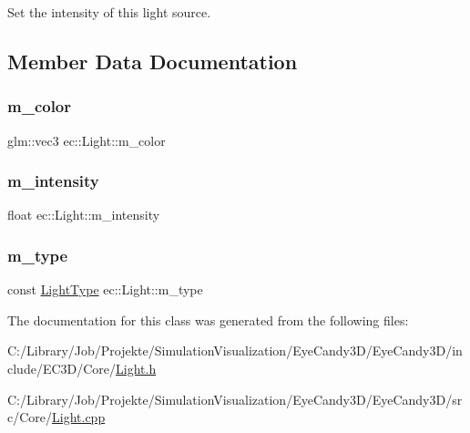 Set the intensity of this light source. 

\subsection{Member Data Documentation}
\mbox{\label{classec_1_1_light_a7dfc41f1e8f2d7ddad97d60c610c302e}} 
\subsubsection{\texorpdfstring{m\+\_\+color}{m\_color}}
{\footnotesize\ttfamily glm\+::vec3 ec\+::\+Light\+::m\+\_\+color\hspace{0.3cm}{\ttfamily [protected]}}

\mbox{\label{classec_1_1_light_ac655cc4148d5aa4d052bace97770f3b1}} 
\subsubsection{\texorpdfstring{m\+\_\+intensity}{m\_intensity}}
{\footnotesize\ttfamily float ec\+::\+Light\+::m\+\_\+intensity\hspace{0.3cm}{\ttfamily [protected]}}

\mbox{\label{classec_1_1_light_ae3d04075982c6c62e7687b214a504c30}} 
\subsubsection{\texorpdfstring{m\+\_\+type}{m\_type}}
{\footnotesize\ttfamily const \mbox{\hyperlink{namespaceec_a30e2a743ebdeb02ac68a6cfa50f629c7}{Light\+Type}} ec\+::\+Light\+::m\+\_\+type\hspace{0.3cm}{\ttfamily [protected]}}



The documentation for this class was generated from the following files\+:\begin{DoxyCompactItemize}
\item 
C\+:/\+Library/\+Job/\+Projekte/\+Simulation\+Visualization/\+Eye\+Candy3\+D/\+Eye\+Candy3\+D/include/\+E\+C3\+D/\+Core/\mbox{\hyperlink{_light_8h}{Light.\+h}}\item 
C\+:/\+Library/\+Job/\+Projekte/\+Simulation\+Visualization/\+Eye\+Candy3\+D/\+Eye\+Candy3\+D/src/\+Core/\mbox{\hyperlink{_light_8cpp}{Light.\+cpp}}\end{DoxyCompactItemize}
